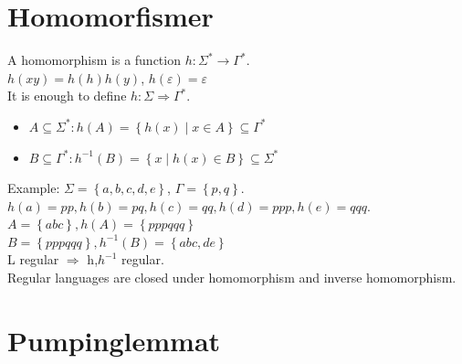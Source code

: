 \documentclass[a4paper]{article}
\begin{document}
    \section{Homomorfismer}
    A homomorphism is a function $h:\Sigma^*\rightarrow \Gamma^*$.\\
    $h(xy)=h(h)h(y)$, $h(\varepsilon)=\varepsilon$\\
    It is enough to define $h:\Sigma \Rightarrow \Gamma^*$.\\
    \begin{itemize}
        \item $A\subseteq \Sigma^*:h(A)=\left\{ h(x) \middle | x\in A \right\}\subseteq \Gamma^*$
        \item $B\subseteq \Gamma^*:h^{-1}(B)=\left\{ x \middle | h(x) \in B \right\} \subseteq \Sigma^*$
    \end{itemize}
    Example: $\Sigma = \left\{ a,b,c,d,e \right\}$, $\Gamma = \left\{ p,q \right\}$.\\
    $h(a)=pp,h(b)=pq,h(c)=qq,h(d)=ppp,h(e)=qqq$.\\
    $A=\left\{ abc \right\},h(A)=\left\{ pppqqq \right\}$\\
    $B=\left\{ pppqqq \right\},h^{-1}(B)=\left\{ abc,de \right\}$\\
    L regular $\Rightarrow$ h,$h^{-1}$ regular.\\
    Regular languages are closed under homomorphism and inverse homomorphism.
    \section{Pumpinglemmat}
\end{document}
